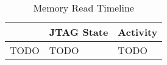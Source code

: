 \begin{table}[htp]
    \centering
    \caption{Memory Read Timeline}
    \label{tab:memread}
    \begin{tabulary}{\textwidth}{|r|l|L|}
        \hline
        & JTAG State & Activity \\
        \hline
        TODO & TODO & TODO \\

\end{tabulary}
\end{table}
